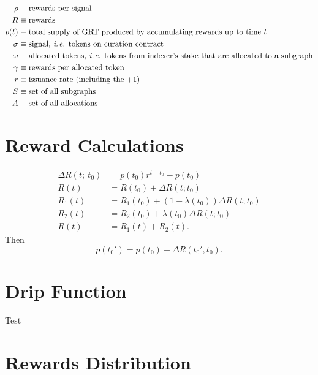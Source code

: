 {\begin{subequations}
\begin{align}
    \rho & \equiv \mbox{rewards per signal} \\
    R & \equiv \mbox{rewards} \\
    p(t) & \equiv \mbox{total supply of GRT produced by accumulating rewards up to time $t$} \\
    \sigma & \equiv \mbox{signal, \ie tokens on curation contract} \\
    \omega & \equiv \mbox{allocated tokens, \ie tokens from indexer's stake that are allocated to a subgraph} \\
    \gamma & \equiv \mbox{rewards per allocated token} \\
    r & \equiv \mbox{issuance rate (including the $+1$)} \\
    S & \equiv \mbox{set of all subgraphs} \\
    A & \equiv \mbox{set of all allocations}
\end{align}
\end{subequations}


\section{Reward Calculations}
\begin{subequations}
\begin{align}
    \Delta R(t;\ t_0) & = p(t_0) r^{t-t_0} - p(t_0) \\
    R(t) & = R(t_0) + \Delta R(t; t_0) \\
    R_1(t) & = R_1(t_0) + (1-\lambda(t_0))\Delta R(t;t_0) \\
    R_2(t) & = R_2(t_0) + \lambda(t_0) \Delta R(t;t_0) \\
    R(t) & = R_1(t) + R_2(t).
\end{align}
\end{subequations}
Then 
\begin{equation}
    p(t_0') = p(t_0) + \Delta R(t_0', t_0).
\end{equation}

\section{Drip Function}
Test

\section{Rewards Distribution}

}
